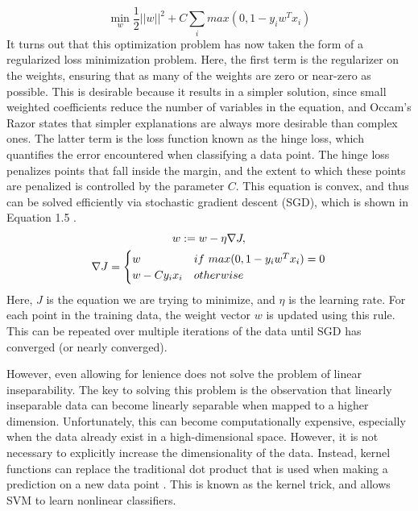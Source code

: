 %
\begin{equation}
\min \limits_{w} \frac{1}{2} ||w||^2 + C \sum_i max(0, 1-y_i w^T x_i)
\label{merged}
\end{equation}
%
It turns out that this optimization problem has now taken the form of a regularized loss minimization problem.  Here, the first term is the regularizer on the weights, ensuring that as many of the weights are zero or near-zero as possible.  This is desirable because it results in a simpler solution, since small weighted coefficients reduce the number of variables in the equation, and Occam's Razor states that simpler explanations are always more desirable than complex ones.  The latter term is the loss function known as the hinge loss, which quantifies the error encountered when classifying a data point.  The hinge loss penalizes points that fall inside the margin, and the extent to which these points are penalized is controlled by the parameter $C$.  This equation is convex, and thus can be solved efficiently via stochastic gradient descent (SGD), which is shown in Equation 1.5 \cite{bottou2010}.
%
\begin{gather}
w := w - \eta \nabla J, \\ \notag
\nabla J = \begin{cases} 
      w             & if\ max(0, 1-y_i w^T x_i) = 0 \\ \notag
      w - C y_i x_i & otherwise
\end{cases}
\end{gather}
%
Here, $J$ is the equation we are trying to minimize, and $\eta$ is the learning rate. For each point in the training data, the weight vector $w$ is updated using this rule.  This can be repeated over multiple iterations of the data until SGD has converged (or nearly converged).

However, even allowing for lenience does not solve the problem of linear inseparability.  The key to solving this problem is the observation that linearly inseparable data can become linearly separable when mapped to a higher dimension.  Unfortunately, this can become computationally expensive, especially when the data already exist in a high-dimensional space.  However, it is not necessary to explicitly increase the dimensionality of the data.  Instead, kernel functions can replace the traditional dot product that is used when making a prediction on a new data point \cite{hofmann2006}.  This is known as the kernel trick, and allows SVM to learn nonlinear classifiers.

